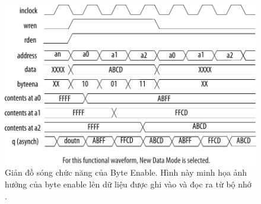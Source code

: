 \begin{figure}[htbp]
    \centering
    \includegraphics[width=0.8\linewidth]{Images/02_02_Memory_ByteEnable.pdf}
    \caption{Giản đồ sóng chức năng của Byte Enable. Hình này minh họa ảnh hưởng của byte enable lên dữ liệu được ghi vào và đọc ra từ bộ nhớ \cite{memory_byteenable}.}
    \label{fig:02_02_memory_byteenable} %
\end{figure}

